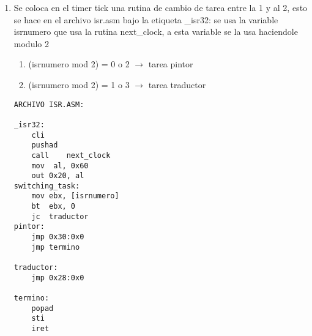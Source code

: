 \documentclass[11pt]{article}
\begin{document}
\begin{enumerate}
\item
Se coloca en el timer tick una rutina de cambio de tarea entre la 1 y al 2, esto se hace en el archivo isr.asm bajo la etiqueta \_isr32:
\indent	se usa la variable isrnumero que usa la rutina next\_clock, a esta variable se la usa haciendole modulo 2
\begin{enumerate}
\item
(isrnumero mod 2) = 0 o 2 $\rightarrow$ tarea pintor

\item
(isrnumero mod 2) = 1 o 3 $\rightarrow$ tarea traductor

\end{enumerate}

\begin{lstlisting}[frame=single]
ARCHIVO ISR.ASM:

_isr32:
	cli
	pushad
	call	next_clock
	mov  al, 0x60
	out 0x20, al
switching_task:
	mov	ebx, [isrnumero]
	bt	ebx, 0
	jc	traductor
pintor:
	jmp	0x30:0x0
	jmp	termino

traductor:
	jmp	0x28:0x0

termino:
	popad
	sti
	iret
\end{lstlisting}

\end{enumerate}
\end{document}
